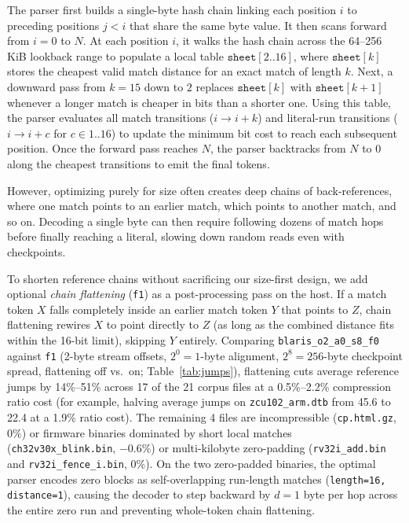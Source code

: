 \documentclass[10pt,twocolumn]{article}
\newcommand{\code}[1]{\texttt{#1}}
\begin{document}
The parser first builds a single-byte hash chain linking each position $i$ to
preceding positions $j < i$ that share the same byte value. It then scans
forward from $i = 0$ to $N$. At each position $i$, it walks the hash chain
across the 64--256\,KiB lookback range to populate a local table
$\code{sheet}[2..16]$, where $\code{sheet}[k]$ stores the cheapest valid match
distance for an exact match of length $k$. Next, a downward pass from $k = 15$
down to $2$ replaces $\code{sheet}[k]$ with $\code{sheet}[k+1]$ whenever a
longer match is cheaper in bits than a shorter one. Using this table, the parser
evaluates all match transitions ($i \to i + k$) and literal-run transitions ($i
\to i + c$ for $c \in 1..16$) to update the minimum bit cost to reach each
subsequent position. Once the forward pass reaches $N$, the parser backtracks
from $N$ to $0$ along the cheapest transitions to emit the final tokens.

However, optimizing purely for size often creates deep chains of back-references,
where one match points to an earlier match, which points to another match, and
so on. Decoding a single byte can then require following dozens of match hops
before finally reaching a literal, slowing down random reads even with
checkpoints.

To shorten reference chains without sacrificing our size-first design, we add
optional \emph{chain flattening} (\code{f1}) as a post-processing pass on the
host. If a match token $X$ falls completely inside an earlier match token $Y$
that points to $Z$, chain flattening rewires $X$ to point directly to $Z$ (as
long as the combined distance fits within the 16-bit limit), skipping $Y$
entirely. Comparing \code{blaris\_o2\_a0\_s8\_f0} against \code{f1} (2-byte
stream offsets, $2^0=1$-byte alignment, $2^8=256$-byte checkpoint spread,
flattening off vs.\ on; Table~\ref{tab:jumps}), flattening cuts average
reference jumps by 14\%--51\% across 17 of the 21 corpus files at a 0.5\%--2.2\%
compression ratio cost (for example, halving average jumps on
\code{zcu102\_arm.dtb} from 45.6 to 22.4 at a 1.9\% ratio cost). The remaining 4
files are incompressible (\code{cp.html.gz}, $0\%$) or firmware binaries
dominated by short local matches (\code{ch32v30x\_blink.bin}, $-0.6\%$) or
multi-kilobyte zero-padding (\code{rv32i\_add.bin} and
\code{rv32i\_fence\_i.bin}, $0\%$). On the two zero-padded binaries, the optimal
parser encodes zero blocks as self-overlapping run-length matches
(\code{length=16, distance=1}), causing the decoder to step backward by $d=1$
byte per hop across the entire zero run and preventing whole-token chain
flattening.
\end{document}
